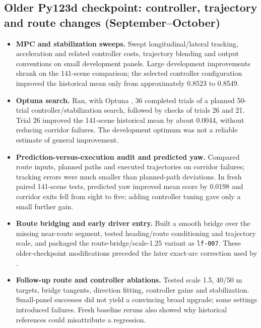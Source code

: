 \subsection{Older Py123d checkpoint: controller, trajectory and route changes (September--October)}
\begin{itemize}\setlength{\itemsep}{3pt}\setlength{\parsep}{0pt}\setlength{\parskip}{0pt}\setlength{\topsep}{3pt}
\item \textbf{MPC and stabilization sweeps.} Swept longitudinal/lateral tracking, acceleration and related controller costs, trajectory blending and output conventions on small development panels. Large development improvements shrank on the 141-scene comparison; the selected controller configuration improved the historical mean only from approximately 0.8523 to 0.8549.
\item \textbf{Optuna search.} Ran, with Optuna \cite{optuna}, 36 completed trials of a planned 50-trial controller/stabilization search, followed by checks of trials 26 and 21. Trial 26 improved the 141-scene historical mean by about 0.0044, without reducing corridor failures. The development optimum was not a reliable estimate of general improvement.
\item \textbf{Prediction-versus-execution audit and predicted yaw.} Compared route inputs, planned paths and executed trajectories on corridor failures; tracking errors were much smaller than planned-path deviations. In fresh paired 141-scene tests, predicted yaw improved mean score by 0.0198 and corridor exits fell from eight to five; adding controller tuning gave only a small further gain.
\item \textbf{Route bridging and early driver entry.} Built a smooth bridge over the missing near-route segment, tested heading/route conditioning and trajectory scale, and packaged the route-bridge/scale-1.25 variant as \texttt{lf-007}. These older-checkpoint modifications preceded the later exact-arc correction used by \lf{}.
\item \textbf{Follow-up route and controller ablations.} Tested scale 1.5, 40/50 m targets, bridge tangents, direction fitting, controller gains and stabilization. Small-panel successes did not yield a convincing broad upgrade; some settings introduced failures. Fresh baseline reruns also showed why historical references could misattribute a regression.

\end{itemize}
